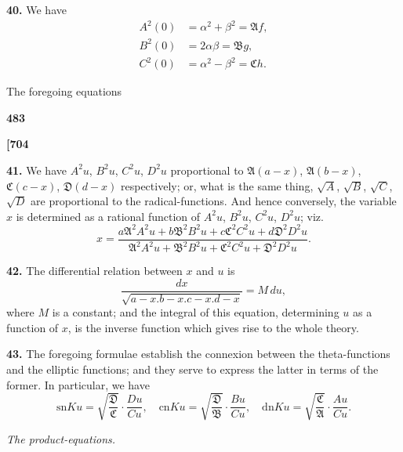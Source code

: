 \documentclass[11pt,a4paper]{book}
\providecommand{\sn}{\mathrm{sn}}
\providecommand{\cn}{\mathrm{cn}}
\providecommand{\dn}{\mathrm{dn}}
\begin{document}
\noindent\textbf{40.}\quad
We have
\begin{align*}
A^2(0) &= \alpha^2 + \beta^2 = \mathfrak{A}f, \\
B^2(0) &= 2\alpha\beta = \mathfrak{B}g, \\
C^2(0) &= \alpha^2 - \beta^2 = \mathfrak{C}h.
\end{align*}

The foregoing equations

\vspace{1em}

\begin{center}
\textbf{483}
\end{center}

\vspace{0.5em}

\noindent\textbf{[704}

\vspace{0.5em}

\noindent\textbf{41.}\quad
We have $A^2 u$, $B^2 u$, $C^2 u$, $D^2 u$ proportional to $\mathfrak{A}(a - x)$, $\mathfrak{A}(b - x)$, $\mathfrak{C}(c - x)$, $\mathfrak{D}(d - x)$ respectively; or, what is the same thing, $\sqrt{A}$, $\sqrt{B}$, $\sqrt{C}$, $\sqrt{D}$ are proportional to the radical-functions. And hence conversely, the variable $x$ is determined as a rational function of $A^2 u$, $B^2 u$, $C^2 u$, $D^2 u$; viz.
\[
x = \frac{a\mathfrak{A}^2 A^2 u + b\mathfrak{B}^2 B^2 u + c\mathfrak{C}^2 C^2 u + d\mathfrak{D}^2 D^2 u}{\mathfrak{A}^2 A^2 u + \mathfrak{B}^2 B^2 u + \mathfrak{C}^2 C^2 u + \mathfrak{D}^2 D^2 u}.
\]

\noindent\textbf{42.}\quad
The differential relation between $x$ and $u$ is
\[
\frac{dx}{\sqrt{a - x . b - x . c - x . d - x}} = M\, du,
\]
where $M$ is a constant; and the integral of this equation, determining $u$ as a function of $x$, is the inverse function which gives rise to the whole theory.

\noindent\textbf{43.}\quad
The foregoing formulae establish the connexion between the theta-functions and the elliptic functions; and they serve to express the latter in terms of the former. In particular, we have
\[
\sn Ku = \sqrt{\frac{\mathfrak{D}}{\mathfrak{C}}} \cdot \frac{Du}{Cu},\quad
\cn Ku = \sqrt{\frac{\mathfrak{D}}{\mathfrak{B}}} \cdot \frac{Bu}{Cu},\quad
\dn Ku = \sqrt{\frac{\mathfrak{C}}{\mathfrak{A}}} \cdot \frac{Au}{Cu}.
\]

\vspace{1em}

\begin{center}
\textit{The product-equations.}
\end{center}
\end{document}
